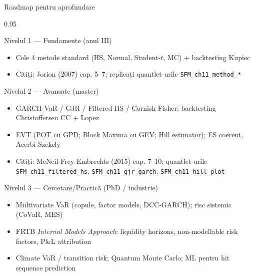 \documentclass[9pt, aspectratio=169, t]{beamer}
\begin{document}
\begin{frame}[shrink=10]{Roadmap pentru aprofundare}
\begin{cminipage}{0.95\textwidth}
\begin{block}{Nivelul 1 --- Fundamente (anul III)}
\begin{itemize}\setlength{\itemsep}{0pt}
    \item Cele 4 metode standard (HS, Normal, Student-$t$, MC) + backtesting Kupiec
    \item Citiți: Jorion (2007) cap. 5--7; replicați quantlet-urile \texttt{SFM\_ch11\_method\_*}
\end{itemize}
\end{block}
\begin{block}{Nivelul 2 --- Avansate (master)}
\begin{itemize}\setlength{\itemsep}{0pt}
    \item GARCH-VaR / GJR / Filtered HS / Cornish-Fisher; backtesting Christoffersen CC + Lopez
    \item EVT (POT cu GPD; Block Maxima cu GEV; Hill estimator); ES coerent, Acerbi-Szekely
    \item Citiți: McNeil-Frey-Embrechts (2015) cap. 7--10; quantlet-urile \texttt{SFM\_ch11\_filtered\_hs}, \texttt{SFM\_ch11\_gjr\_garch}, \texttt{SFM\_ch11\_hill\_plot}
\end{itemize}
\end{block}
\begin{block}{Nivelul 3 --- Cercetare/Practică (PhD / industrie)}
\begin{itemize}\setlength{\itemsep}{0pt}
    \item Multivariate VaR (copule, factor models, DCC-GARCH); risc sistemic (CoVaR, MES)
    \item FRTB \emph{Internal Models Approach}: liquidity horizons, non-modellable risk factors, P\&L attribution
    \item Climate VaR / transition risk; Quantum Monte Carlo; ML pentru hit sequence prediction
\end{itemize}
\end{block}
\end{cminipage}
\end{frame}
\end{document}
